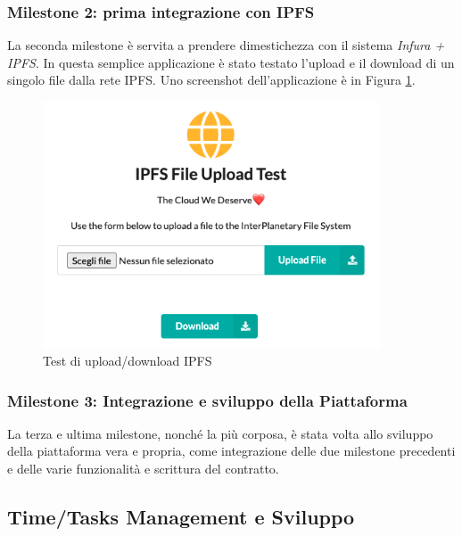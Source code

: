 \documentclass{article}
\begin{document}
\subsubsection{Milestone 2: prima integrazione con IPFS}
La seconda milestone è servita a prendere dimestichezza con il sistema \textit{Infura + IPFS}. In questa semplice applicazione è stato testato l'upload e il download di un singolo file dalla rete IPFS. Uno screenshot dell'applicazione è in Figura \ref{fig:ipfs}.
\begin{figure}[!ht]
  \includegraphics[width=10cm]{images/ipfs.png}
  \centering
  \caption{Test di upload/download IPFS}
  \label{fig:ipfs}
\end{figure}

\subsubsection{Milestone 3: Integrazione e sviluppo della Piattaforma}
La terza e ultima milestone, nonché la più corposa, è stata volta allo sviluppo della piattaforma vera e propria, come integrazione delle due milestone precedenti e delle varie funzionalità e scrittura del contratto.

\subsection{Time/Tasks Management e Sviluppo}
\end{document}
